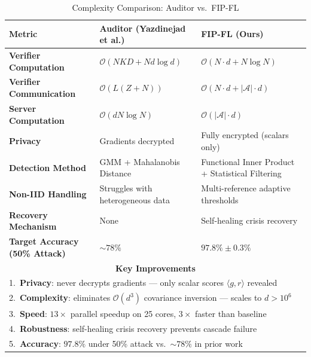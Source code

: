 \documentclass[10pt,journal,compsoc]{IEEEtran}
\begin{document}
\begin{table}[htbp]
\caption{Complexity Comparison: Auditor vs.\ FIP-FL}
\label{tab:comparison}
\centering
\renewcommand{\arraystretch}{1.4}
\begin{tabular}{|l|l|l|}
\hline
\textbf{Metric} & \textbf{Auditor (Yazdinejad et al.)} & \textbf{FIP-FL (Ours)} \\
\hline
\textbf{Verifier Computation}
  & $\mathcal{O}(NKD + Nd\log d)$
  & $\mathcal{O}(N{\cdot}d + N\log N)$ \\
\hline
\textbf{Verifier Communication}
  & $\mathcal{O}(L(Z+N))$
  & $\mathcal{O}(N{\cdot}d + |\mathcal{A}|{\cdot}d)$ \\
\hline
\textbf{Server Computation}
  & $\mathcal{O}(dN\log N)$
  & $\mathcal{O}(|\mathcal{A}| \cdot d)$ \\
\hline
\textbf{Privacy}
  & Gradients decrypted
  & Fully encrypted (scalars only) \\
\hline
\textbf{Detection Method}
  & GMM + Mahalanobis Distance
  & Functional Inner Product + Statistical Filtering \\
\hline
\textbf{Non-IID Handling}
  & Struggles with heterogeneous data
  & Multi-reference adaptive thresholds \\
\hline
\textbf{Recovery Mechanism}
  & None
  & Self-healing crisis recovery \\
\hline
\textbf{Target Accuracy (50\% Attack)}
  & ${\sim}78\%$
  & $\mathbf{97.8\% \pm 0.3\%}$ \\
\hline
\multicolumn{3}{|c|}{\textbf{Key Improvements}} \\
\hline
\multicolumn{3}{|l|}{1.~\textbf{Privacy}: never decrypts gradients ---
  only scalar scores $\langle g, r \rangle$ revealed} \\
\multicolumn{3}{|l|}{2.~\textbf{Complexity}: eliminates $\mathcal{O}(d^3)$
  covariance inversion --- scales to $d > 10^6$} \\
\multicolumn{3}{|l|}{3.~\textbf{Speed}: $13\times$ parallel speedup on 25 cores,
  $3\times$ faster than baseline} \\
\multicolumn{3}{|l|}{4.~\textbf{Robustness}: self-healing crisis recovery prevents
  cascade failure} \\
\multicolumn{3}{|l|}{5.~\textbf{Accuracy}: $97.8\%$ under 50\% attack vs.\
  ${\sim}78\%$ in prior work} \\
\hline
\end{tabular}
\end{table}
\end{document}
